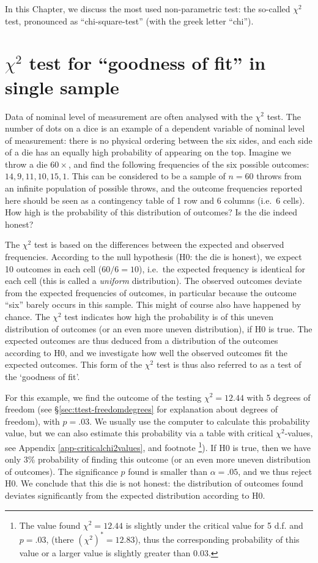 \documentclass[
]{book}
\begin{document}
In this Chapter, we discuss the most used non-parametric
test: the so-called \(\chi^2\) test, pronounced as ``chi-square-test'' (with the greek letter ``chi'').

\section{\texorpdfstring{\(\chi^2\) test for ``goodness of fit'' in single sample}{\textbackslash chi\^{}2 test for ``goodness of fit'' in single sample}}\label{sec:chi2gof}

Data of nominal level of measurement are often analysed with the
\(\chi^2\) test. The number of dots on a dice
is an example of a dependent variable of nominal level of measurement:
there is no physical ordering between the six sides, and each side of a die has
an equally high probability of appearing on the top. Imagine we throw
a die \(60\times\), and find the following frequencies
of the six possible outcomes: \(14, 9, 11, 10, 15, 1\). This can be
considered to be a sample of \(n=60\) throws from an infinite
population of possible throws, and the outcome frequencies reported here should
be seen as a contingency table of 1 row and 6
columns (i.e.~6 cells). How high is the probability of this distribution
of outcomes? Is the die indeed honest?

The \(\chi^2\) test is based on the differences between the expected
and observed frequencies. According to the null hypothesis (H0: the die is honest),
we expect 10 outcomes in each cell (\(60/6=10\)), i.e.~the
expected frequency is identical for each cell (this is called
a \emph{uniform} distribution).
The observed outcomes deviate from the expected frequencies of outcomes,
in particular because the outcome ``six'' barely occurs in this sample. This
might of course also have happened by chance. The \(\chi^2\) test indicates how high the probability is of this uneven distribution of outcomes (or an even more uneven distribution),
if H0 is true.
The expected outcomes are thus deduced from a distribution of the outcomes
according to H0, and we investigate how well the observed outcomes
fit the expected outcomes. This form of the \(\chi^2\) test is thus also
referred to as a test of the `goodness of fit'.

For this example, we find the outcome of the testing \(\chi^2=12.44\)
with 5 degrees of freedom (see
§\ref{sec:ttest-freedomdegrees} for explanation about
degrees of freedom), with \(p=.03\). We usually use the computer to
calculate this probability value, but we can also estimate this probability
via a table with critical
\(\chi^2\)-values, see Appendix \ref{app-criticalchi2values}, and footnote
\footnote{The value found \(\chi^2=12.44\) is slightly under the critical value for 5 d.f. and \(p=.03\), (there \((\chi^2)^*=12.83\)), thus the corresponding probability of this value or a larger value is slightly greater than \(0.03\).}).
If H0 is true, then we have only 3\% probability
of finding this outcome (or an even more uneven distribution of outcomes).
The significance \(p\) found is smaller than \(\alpha=.05\), and we thus
reject H0. We conclude that this die is not honest: the distribution
of outcomes found deviates significantly from the expected
distribution according to H0.
\end{document}
